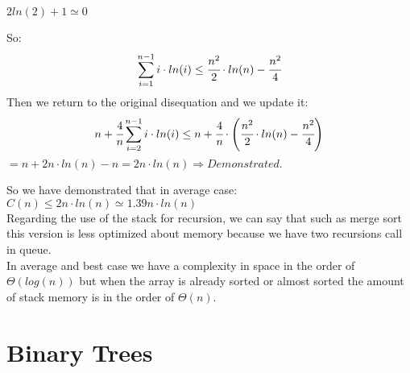 \documentclass{article}
\begin{document}
\begin{large}
$2ln(2) + 1 \simeq 0$

So:\\
$$\sum_{i=1}^{n-1} i \cdot ln(i) \leq \cfrac{n^2}{2}\cdot ln(n) - \cfrac{n^2}{4}$$
Then we return to the original disequation and we update it:\\
$$ n + \cfrac{4}{n} \sum_{i=2}^{n-1} i \cdot ln(i) \leq n + \cfrac{4}{n} \cdot \left(\cfrac{n^2}{2}\cdot ln(n) - \cfrac{n^2}{4} \right)$$
$= n + 2n\cdot ln(n) -n = 2n\cdot ln(n) \Rightarrow Demonstrated.$

So we have demonstrated that in average case: \\ 
$C(n) \leq 2n\cdot ln(n) \simeq 1.39n\cdot ln(n)$\\

Regarding the use of the stack for recursion, we can say that such as merge sort this version is less optimized about memory because we have two recursions call in queue.\\
In average and best case we have a complexity in space in the order of $\Theta(log(n))$ but when the array is already sorted or almost sorted the amount of stack memory is in the order of $\Theta(n)$.
\end{large}
\section{Binary Trees}
\end{document}

